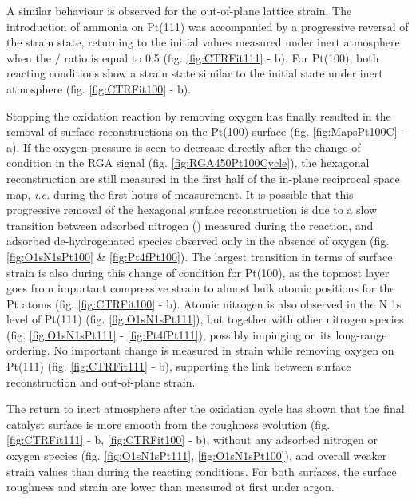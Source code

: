 A similar behaviour is observed for the out-of-plane lattice strain.
The introduction of ammonia on Pt(111) was accompanied by a progressive reversal of the strain state, returning to the initial values measured under inert atmosphere when the / ratio is equal to \num{0.5} (fig. \ref{fig:CTRFit111} - b).
For Pt(100), both reacting conditions show a strain state similar to the initial state under inert atmosphere (fig. \ref{fig:CTRFit100} - b).


Stopping the oxidation reaction by removing oxygen has finally resulted in the removal of surface reconstructions on the Pt(100) surface (fig. \ref{fig:MapsPt100C} - a).
If the oxygen pressure is seen to decrease directly after the change of condition in the RGA signal (fig. \ref{fig:RGA450Pt100Cycle}), the hexagonal reconstruction are still measured in the first half of the in-plane reciprocal space map, \textit{i.e.} during the first hours of measurement.
It is possible that this progressive removal of the hexagonal surface reconstruction is due to a slow transition between adsorbed nitrogen () measured during the reaction, and adsorbed de-hydrogenated species observed only in the absence of oxygen (fig. \ref{fig:O1sN1sPt100} \& \ref{fig:Pt4fPt100}).
The largest transition in terms of surface strain is also during this change of condition for Pt(100), as the topmost layer goes from important compressive strain to almost bulk atomic positions for the Pt atoms (fig. \ref{fig:CTRFit100} - b).
Atomic nitrogen is also observed in the N 1s level of Pt(111) (fig. \ref{fig:O1sN1sPt111}), but together with other nitrogen species (fig. \ref{fig:O1sN1sPt111} - \ref{fig:Pt4fPt111}), possibly impinging on its long-range ordering.
No important change is measured in strain while removing oxygen on Pt(111) (fig. \ref{fig:CTRFit111} - b), supporting the link between surface reconstruction and out-of-plane strain.


The return to inert atmosphere after the oxidation cycle has shown that the final catalyst surface is more smooth from the roughness evolution (fig. \ref{fig:CTRFit111} - b, \ref{fig:CTRFit100} - b), without any adsorbed nitrogen or oxygen species (fig. \ref{fig:O1sN1sPt111}, \ref{fig:O1sN1sPt100}), and overall weaker strain values than during the reacting conditions.
For both surfaces, the surface roughness and strain are lower than measured at first under argon.

